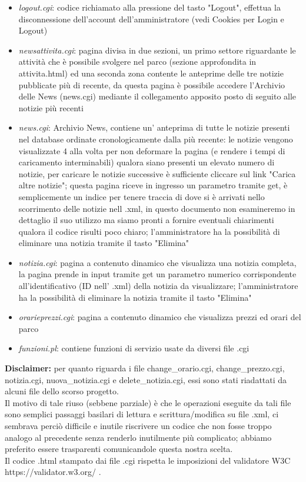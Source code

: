 \documentclass[12pt]{article}
\begin{document}
\begin{itemize}
\item \textit{logout.cgi}: codice richiamato alla pressione del tasto "Logout", effettua la disconnessione dell'account dell'amministratore (vedi Cookies per Login e Logout)
\item \textit{newsattivita.cgi}:  pagina divisa in due sezioni, un primo settore riguardante le attivit\`a che \`e possibile svolgere nel parco (sezione approfondita in attivita.html) ed una seconda zona contente le anteprime delle tre notizie pubblicate pi\`u di recente, da questa pagina \`e possibile accedere l'Archivio delle News (news.cgi) mediante il collegamento apposito posto di seguito alle notizie pi\`u recenti
\item \textit{news.cgi}: Archivio News, contiene un' anteprima di tutte le notizie presenti nel database ordinate cronologicamente dalla pi\`u recente: le notizie vengono visualizzate 4 alla volta per non deformare la pagina (e rendere i tempi di caricamento interminabili) qualora siano presenti un elevato numero di notizie, per caricare le notizie successive \`e sufficiente cliccare sul link "Carica altre notizie"; questa pagina riceve in ingresso un parametro tramite get, \`e semplicemente un indice per tenere traccia di dove si \`e arrivati nello scorrimento delle notizie nell .xml, in questo documento non esamineremo in dettaglio il suo utilizzo ma siamo pronti a fornire eventuali chiarimenti qualora il codice risulti poco chiaro; l'amministratore ha la possibilit\`a di eliminare una notizia tramite il tasto "Elimina"
\item \textit{notizia.cgi}: pagina a contenuto dinamico che visualizza una notizia completa, la pagina prende in input tramite get un parametro numerico corrispondente all'identificativo (ID nell' .xml) della notizia da visualizzare; l'amministratore ha la possibilit\`a di eliminare la notizia tramite il tasto "Elimina"
\item \textit{orarieprezzi.cgi}: pagina a contenuto dinamico che visualizza prezzi ed orari del parco
\item \textit{funzioni.pl}: contiene funzioni di servizio usate da diversi file .cgi
\end{itemize}	

\textbf{Disclaimer:} per quanto riguarda i file change\_orario.cgi, change\_prezzo.cgi, notizia.cgi, nuova\_notizia.cgi e delete\_notizia.cgi, essi sono stati riadattati da alcuni file dello scorso progetto. 
\\ Il motivo di tale riuso (sebbene parziale) \`e che le operazioni eseguite da tali file sono semplici passaggi basilari di lettura e scrittura/modifica su file .xml, ci sembrava perci\`o difficile e inutile riscrivere un codice che non fosse troppo analogo al precedente senza renderlo inutilmente pi\`u complicato; abbiamo preferito essere trasparenti comunicandole questa nostra scelta.\\ Il codice .html stampato dai file .cgi rispetta le imposizioni del validatore W3C https://validator.w3.org/ .
\newpage
\end{document}
